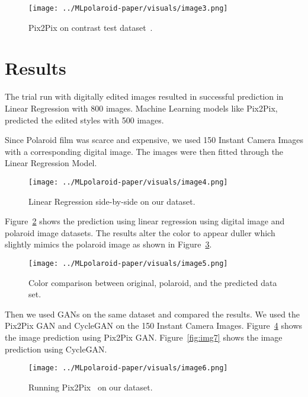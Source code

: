 \documentclass[conference]{IEEEtran}
\begin{document}
\begin{figure}[htb!]
	\begin{center}
	\texttt{[image: ../MLpolaroid-paper/visuals/image3.png]}
	\caption{Pix2Pix on contrast test dataset~\cite{isola2017image}.}
	\label{fig:img3} 
	\end{center}
\end{figure}

\section{Results}\label{section:Results}

The trial run with digitally edited images resulted in successful prediction in Linear Regression with 800 images. Machine Learning models like Pix2Pix, predicted the edited styles with 500 images.  

Since Polaroid film was scarce and expensive, we used 150 Instant Camera Images with a corresponding digital image. The images were then fitted through the Linear Regression Model. 

\begin{figure}[htb!]
	\begin{center}
	\texttt{[image: ../MLpolaroid-paper/visuals/image4.png]}
	\caption{Linear Regression side-by-side on our dataset.}
	\label{fig:img4} 
	\end{center}
\end{figure}

Figure~\ref{fig:img4} shows the prediction using linear regression using digital image and polaroid image datasets. The results alter the color to appear duller which slightly mimics the polaroid image as shown in Figure~\ref{fig:img5}. 

\begin{figure}[htb!]
	\begin{center}
	\texttt{[image: ../MLpolaroid-paper/visuals/image5.png]}
	\caption{Color comparison between original, polaroid, and the predicted data set.}
	\label{fig:img5} 
	\end{center}
\end{figure}

Then we used GANs on the same dataset and compared the results. We used the Pix2Pix GAN and CycleGAN on the 150 Instant Camera Images. Figure~\ref{fig:img6} shows the image prediction using Pix2Pix GAN. Figure~\ref{fig:img7} shows the image prediction using CycleGAN.

\begin{figure}[htb!]
	\begin{center}
	\texttt{[image: ../MLpolaroid-paper/visuals/image6.png]}
	\caption{Running Pix2Pix~\cite{isola2017image} on our dataset.}
	\label{fig:img6} 
	\end{center}
\end{figure}
\end{document}
